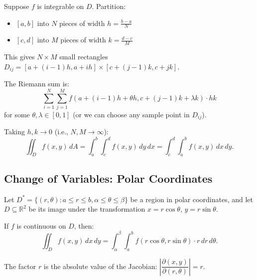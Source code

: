 \documentclass[11pt]{report}
\newcommand{\R}{\mathbb{R}}
\begin{document}
Suppose $f$ is integrable on $D$. Partition:
\begin{itemize}
    \item $[a, b]$ into $N$ pieces of width $h = \frac{b-a}{N}$
    \item $[c, d]$ into $M$ pieces of width $k = \frac{d-c}{M}$
\end{itemize}

This gives $N \times M$ small rectangles $D_{ij} = [a + (i-1)h, a + ih] \times [c + (j-1)k, c + jk]$.

The Riemann sum is:
\[
\sum_{i=1}^{N} \sum_{j=1}^{M} f(a + (i-1)h + \theta h, c + (j-1)k + \lambda k) \cdot hk
\]
for some $\theta, \lambda \in [0, 1]$ (or we can choose any sample point in $D_{ij}$).

Taking $h, k \to 0$ (i.e., $N, M \to \infty$):
\[
\iint_D f(x, y) \, dA = \int_a^b \int_c^d f(x, y) \, dy \, dx = \int_c^d \int_a^b f(x, y) \, dx \, dy.
\]

\subsection*{Change of Variables: Polar Coordinates}

\begin{theorem}
Let $D^* = \{(r, \theta) : a \leq r \leq b, \alpha \leq \theta \leq \beta\}$ be a region in polar coordinates, and let $D \subseteq \R^2$ be its image under the transformation $x = r\cos\theta$, $y = r\sin\theta$.

If $f$ is continuous on $D$, then:
\[
\iint_D f(x, y) \, dx\, dy = \int_\alpha^\beta \int_a^b f(r\cos\theta, r\sin\theta) \cdot r \, dr \, d\theta.
\]

The factor $r$ is the absolute value of the Jacobian: $\left| \dfrac{\partial(x, y)}{\partial(r, \theta)} \right| = r$.
\end{theorem}
\end{document}
